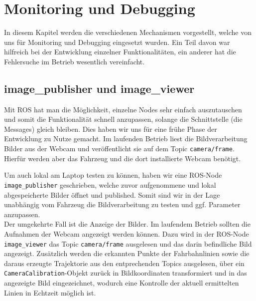 \section{Monitoring und Debugging}
\label{sec:monitoring}


In diesem Kapitel werden die verschiedenen Mechanismen vorgestellt, welche von uns f\"ur Monitoring und Debugging eingesetzt wurden. Ein Teil davon war hilfreich bei der Entwicklung einzelner Funktionalit\"aten, ein anderer hat die Fehlersuche im Betrieb wesentlich vereinfacht.

\subsection{image\_publisher und image\_viewer}
Mit ROS hat man die M\"oglichkeit, einzelne Nodes sehr einfach auszutauschen und somit die Funktionalit\"at schnell anzupassen, solange die Schnittstelle (die Messages) gleich bleiben. Dies haben wir uns f\"ur eine fr\"uhe Phase der Entwicklung zu Nutze gemacht. Im laufenden Betrieb liest die Bildverarbeitung Bilder aus der Webcam und ver\"offentlicht sie auf dem Topic \texttt{camera/frame}. Hierf\"ur werden aber das Fahrzeug und die dort installierte Webcam ben\"otigt.

Um auch lokal am Laptop testen zu k\"onnen, haben wir eine ROS-Node \texttt{image\_publisher} geschrieben, welche zuvor aufgenommene und lokal abgespeicherte Bilder \"offnet und published. Somit sind wir in der Lage unabh\"angig vom Fahrzeug die Bildverarbeitung zu testen und ggf. Parameter anzupassen.\\

Der umgekehrte Fall ist die Anzeige der Bilder. Im laufendem Betrieb sollten die Aufnahmen der Webcam angezeigt werden k\"onnen. Dazu wird in der ROS-Node \texttt{image\_viewer} das Topic \texttt{camera/frame} ausgelesen und das darin befindliche Bild angezeigt.
Zus\"atzlich werden die erkannten Punkte der Fahrbahnlinien sowie die daraus erzeugte 
Trajektorie aus den entprechenden Topics ausgelesen, \"uber ein 
\texttt{CameraCalibration}-Objekt zur\"uck in Bildkoordinaten transformiert und in
das angezeigte Bild eingezeichnet, wodurch eine Kontrolle der aktuell ermittelten
Linien in Echtzeit m\"oglich ist. 

